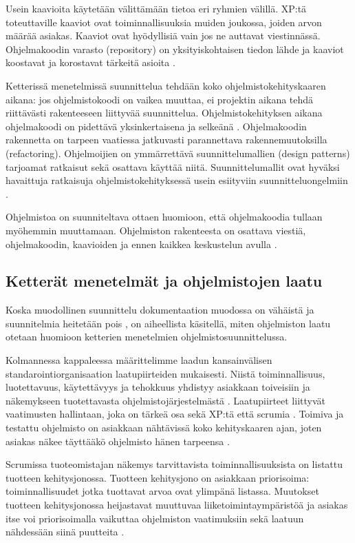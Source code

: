 \documentclass[finnish]{tktltiki2}
\theoremstyle{definition}
\theoremstyle{remark}
\begin{document}
Usein kaavioita käytetään välittämään tietoa eri ryhmien välillä. XP:tä toteuttaville kaaviot ovat toiminnallisuuksia muiden joukossa, joiden arvon määrää asiakas. Kaaviot ovat hyödyllisiä vain jos ne auttavat viestinnässä. Ohjelmakoodin varasto (repository) on yksityiskohtaisen tiedon lähde ja kaaviot koostavat ja korostavat tärkeitä asioita \cite{FOW01b}.

Ketterissä menetelmissä suunnittelua tehdään koko ohjelmistokehityskaaren aikana: jos ohjelmistokoodi on vaikea muuttaa, ei projektin aikana tehdä riittävästi rakenteeseen liittyvää suunnittelua. Ohjelmistokehityksen aikana ohjelmakoodi on pidettävä yksinkertaisena ja selkeänä \cite{FOW01b}.
Ohjelmakoodin rakennetta on tarpeen vaatiessa jatkuvasti parannettava rakennemuutoksilla (refactoring). Ohjelmoijien on ymmärrettävä suunnittelumallien (design patterns) tarjoamat ratkaisut sekä osattava käyttää niitä. Suunnittelumallit ovat hyväksi havaittuja ratkaisuja ohjelmistokehityksessä usein esiityviin suunnitteluongelmiin \cite{FOW01b}.

Ohjelmistoa on suunniteltava ottaen huomioon, että ohjelmakoodia tullaan myöhemmin muuttamaan. Ohjelmiston rakenteesta on osattava viestiä, ohjelmakoodin, kaavioiden ja ennen kaikkea keskustelun avulla \cite{FOW01b}.

\subsection{Ketterät menetelmät ja ohjelmistojen laatu}

Koska muodollinen suunnittelu dokumentaation muodossa on vähäistä ja suunnitelmia heitetään pois \cite{FOW01b}, on aiheellista käsitellä, miten ohjelmiston laatu otetaan huomioon ketterien menetelmien ohjelmistosuunnittelussa.

Kolmannessa kappaleessa määrittelimme laadun kansainvälisen standarointiorganisaation laatupiirteiden mukaisesti. Niistä toiminnallisuus, luotettavuus, käytettävyys ja tehokkuus yhdistyy asiakkaan toiveisiin ja näkemykseen tuotettavasta ohjelmisto\-järjestelmästä \cite{KIP96}. Laatupiirteet liittyvät vaatimusten hallintaan, joka on tärkeä osa sekä XP:tä \cite{BEC99} että scrumia \cite{SCH09}. Toimiva ja testattu ohjelmisto on asiakkaan nähtävissä koko kehityskaaren ajan, joten asiakas näkee täyttääkö ohjelmisto hänen tarpeensa \cite{BEC99}.

Scrumissa tuoteomistajan näkemys tarvittavista toiminnallisuuksista on listattu tuotteen kehitysjonossa. Tuotteen kehitysjono on asiakkaan priorisoima: toiminnallisuudet jotka tuottavat arvoa ovat ylimpänä listassa. Muutokset tuotteen kehitysjonossa heijastavat muuttuvaa liiketoimintaympäristöä ja asiakas itse voi priorisoimalla vaikuttaa ohjelmiston vaatimuksiin sekä laatuun nähdessään siinä puutteita \cite{SCH09}.
\end{document}
